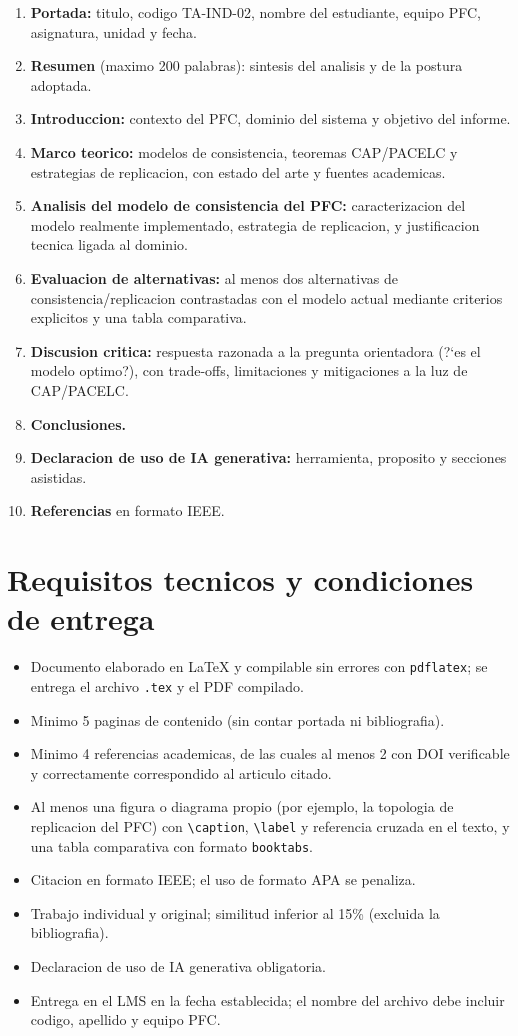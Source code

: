 \documentclass[11pt,a4paper]{article}
\begin{document}
\begin{enumerate}
    \item \textbf{Portada:} titulo, codigo TA-IND-02, nombre del estudiante, equipo PFC, asignatura, unidad y fecha.
    \item \textbf{Resumen} (maximo 200 palabras): sintesis del analisis y de la postura adoptada.
    \item \textbf{Introduccion:} contexto del PFC, dominio del sistema y objetivo del informe.
    \item \textbf{Marco teorico:} modelos de consistencia, teoremas CAP/PACELC y estrategias de replicacion, con estado del arte y fuentes academicas.
    \item \textbf{Analisis del modelo de consistencia del PFC:} caracterizacion del modelo realmente implementado, estrategia de replicacion, y justificacion tecnica ligada al dominio.
    \item \textbf{Evaluacion de alternativas:} al menos dos alternativas de consistencia/replicacion contrastadas con el modelo actual mediante criterios explicitos y una tabla comparativa.
    \item \textbf{Discusion critica:} respuesta razonada a la pregunta orientadora (?`es el modelo optimo?), con trade-offs, limitaciones y mitigaciones a la luz de CAP/PACELC.
    \item \textbf{Conclusiones.}
    \item \textbf{Declaracion de uso de IA generativa:} herramienta, proposito y secciones asistidas.
    \item \textbf{Referencias} en formato IEEE.
\end{enumerate}

\section{Requisitos tecnicos y condiciones de entrega}
\begin{itemize}
    \item Documento elaborado en LaTeX y compilable sin errores con \texttt{pdflatex}; se entrega el archivo \texttt{.tex} y el PDF compilado.
    \item Minimo 5 paginas de contenido (sin contar portada ni bibliografia).
    \item Minimo 4 referencias academicas, de las cuales al menos 2 con DOI verificable y correctamente correspondido al articulo citado.
    \item Al menos una figura o diagrama propio (por ejemplo, la topologia de replicacion del PFC) con \texttt{\textbackslash caption}, \texttt{\textbackslash label} y referencia cruzada en el texto, y una tabla comparativa con formato \texttt{booktabs}.
    \item Citacion en formato IEEE; el uso de formato APA se penaliza.
    \item Trabajo individual y original; similitud inferior al 15\% (excluida la bibliografia).
    \item Declaracion de uso de IA generativa obligatoria.
    \item Entrega en el LMS en la fecha establecida; el nombre del archivo debe incluir codigo, apellido y equipo PFC.
\end{itemize}
\end{document}
